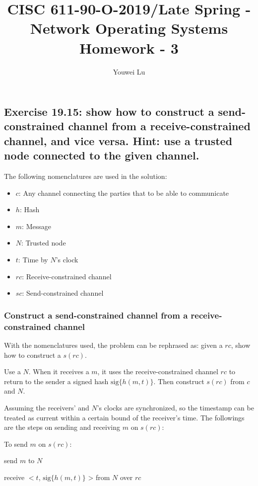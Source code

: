 \documentclass[doc,natbib,12pt]{article}
\title{CISC 611-90-O-2019/Late Spring - Network Operating Systems \\ Homework - 3}
\author{Youwei Lu}
\date{}
\begin{document}
	\maketitle
	
	
	\subsection*{Exercise 19.15: show how to construct a send-constrained channel from a receive-constrained channel, and vice versa. Hint: use a trusted node connected to the given channel.}
	
	The following nomenclatures are used in the solution:
	\begin{itemize}
		\item $c$: Any channel connecting the parties that to be able to communicate
		\item $h$: Hash
		\item $m$: Message
		\item $N$: Trusted node
		\item $t$: Time by $N$'s clock
		\item $rc$: Receive-constrained channel
		\item $sc$: Send-constrained channel
	\end{itemize}

	
	\subsubsection*{Construct a send-constrained channel from a receive-constrained channel}
	
	With the nomenclatures used, the problem can be rephrased as: given a $rc$, show how to construct a $s(rc)$.
	
	Use a $N$. When it receives a $m$, it uses the receive-constrained channel $rc$ to return to the sender a signed hash $\text{sig}\{h(m,t)\}$. Then construct $s(rc)$ from $c$ and $N$. 
	
	Assuming the receivers' and $N$'s clocks are synchronized, so the timestamp can be treated as current within a certain bound of the receiver's time.
	The followings are the steps on sending and receiving $m$ on  $s(rc)$:
	
	To send $m$ on $s(rc)$:
	
	\hspace{0.628in} send $m$ to $N$
	
	\hspace{0.628in} receive $< t$, $\text{sig}\{h(m,t)\}$ > from $N$ over $rc$
	
\end{document}
